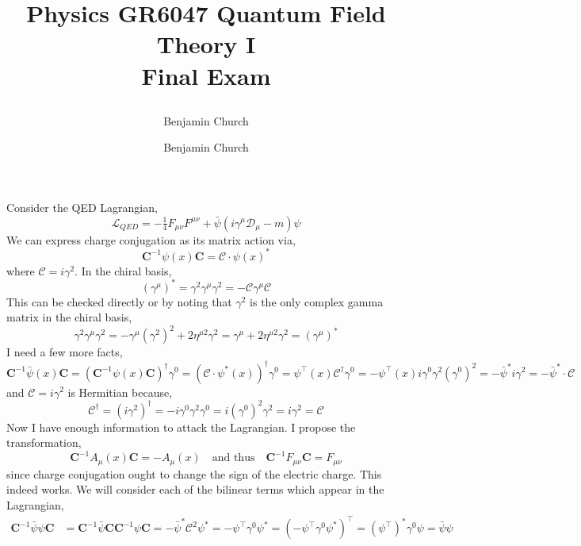\documentclass[12pt]{article}
\author{Benjamin Church }
\newcommand{\lagrange}{\mathcal{L}}
\newcommand{\conj}{\mathbf{C}}
\begin{document}
\newcommand{\MeV}{\: \mathrm{MeV}}
\newcommand{\GeV}{\: \mathrm{GeV}}

\title{%
	\large \textbf{Physics GR6047 Quantum Field Theory I
	\\ Final Exam \vspace{-2ex}}
\author{Benjamin Church }
}
\maketitle

\section{}

\newcommand{\cmat}{\mathcal{C}}
\newcommand{\gs}{g_e}
\newcommand{\gp}{g_o}

Consider the QED Lagrangian,
\[ \lagrange_{QED} = - \tfrac{1}{4} F_{\mu \nu} F^{\mu \nu} + \bar{\psi} (i \gamma^\mu \mathcal{D}_\mu - m ) \psi \]
We can express charge conjugation as its matrix action via,
\[\conj^{-1} \psi(x) \conj = \mathcal{C} \cdot \psi(x)^* \]
where $\mathcal{C} = i \gamma^2$. 
In the chiral basis,
\[ (\gamma^\mu)^* = \gamma^2 \gamma^\mu \gamma^2 = - \mathcal{C} \gamma^\mu  \mathcal{C} \]
This can be checked directly or by noting that $\gamma^2$ is the only complex gamma matrix in the chiral basis,
\[ \gamma^2 \gamma^\mu \gamma^2 = - \gamma^\mu (\gamma^2)^2 + 2 \eta^{\mu 2}  \gamma^2 = \gamma^\mu + 2 \eta^{\mu 2}  \gamma^2 = (\gamma^\mu)^* \]
I need a few more facts,
\[ \conj^{-1} \bar{\psi}(x) \conj = (\conj^{-1} \psi(x) \conj)^{\dagger} \gamma^0 = \left(\mathcal{C} \cdot \psi^*(x) \right)^\dagger \gamma^0 = \psi^{\top}(x) \mathcal{C}^\dagger \gamma^0 = - \psi^{\top}(x) i \gamma^0 \gamma^2 (\gamma^0)^2 = - \bar{\psi}^* i \gamma^2 = - \bar{\psi}^{*} \cdot \mathcal{C} \]    
and $\mathcal{C} = i \gamma^2$ is Hermitian because,
\[ \mathcal{C}^\dagger = (i \gamma^2)^\dagger = -i \gamma^0 \gamma^2 \gamma^0 = i(\gamma^0)^2 \gamma^2 = i \gamma^2 = \mathcal{C} \]
Now I have enough information to attack the Lagrangian. I propose the transformation,
\[ \conj^{-1} A_\mu(x) \conj = - A_\mu(x) \quad \text{and thus} \quad \conj^{-1} F_{\mu \nu} \conj = F_{\mu \nu}\]
since charge conjugation ought to change the sign of the electric charge. This indeed works. We will consider each of the bilinear terms which appear in the Lagrangian,
\begin{align*}
\conj^{-1} \bar{\psi} \psi \conj & = \conj^{-1} \bar{\psi} \conj \conj^{-1} \psi \conj = - \bar{\psi}^* \cmat^2 \psi^* = - \psi^\top \gamma^0 \psi^* = (- \psi^\top \gamma^0 \psi^*)^\top = (\psi^\top)^* \gamma^0 \psi = \bar{\psi} \psi
\end{align*}
\end{document}
